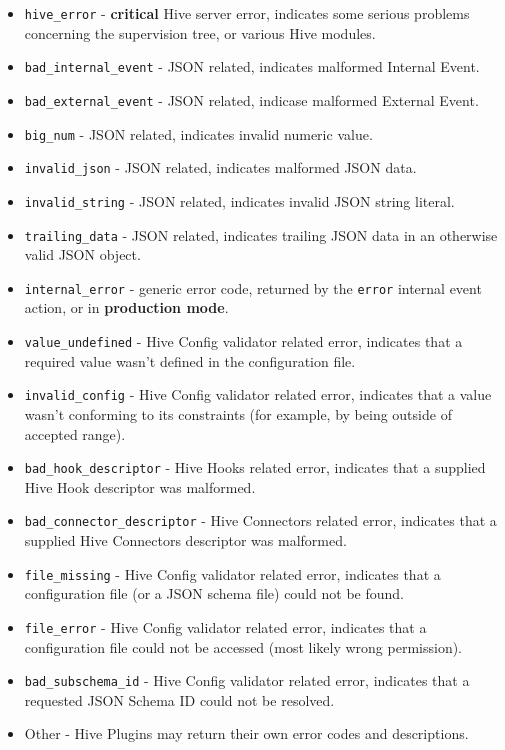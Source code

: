 \documentclass[a4paper]{article}
\begin{document}
\begin{itemize}
\item \texttt{hive\_error} - \textbf{critical} Hive server error, indicates some serious problems concerning the supervision tree, or various Hive modules.
\item \texttt{bad\_internal\_event} - JSON related, indicates malformed Internal Event.
\item \texttt{bad\_external\_event} - JSON related, indicase malformed External Event.
\item \texttt{big\_num} - JSON related, indicates invalid numeric value.
\item \texttt{invalid\_json} - JSON related, indicates malformed JSON data.
\item \texttt{invalid\_string} - JSON related, indicates invalid JSON string literal.
\item \texttt{trailing\_data} - JSON related, indicates trailing JSON data in an otherwise valid JSON object.
\item \texttt{internal\_error} - generic error code, returned by the \texttt{error} internal event action, or in \textbf{production mode}.
\item \texttt{value\_undefined} - Hive Config validator related error, indicates that a required value wasn't defined in the configuration file.
\item \texttt{invalid\_config} - Hive Config validator related error, indicates that a value wasn't conforming to its constraints (for example, by being outside of accepted range).
\item \texttt{bad\_hook\_descriptor} - Hive Hooks related error, indicates that a supplied Hive Hook descriptor was malformed.
\item \texttt{bad\_connector\_descriptor} - Hive Connectors related error, indicates that a supplied Hive Connectors descriptor was malformed.
\item \texttt{file\_missing} - Hive Config validator related error, indicates that a configuration file (or a JSON schema file) could not be found.
\item \texttt{file\_error} - Hive Config validator related error, indicates that a configuration file could not be accessed (most likely wrong permission).
\item \texttt{bad\_subschema\_id} - Hive Config validator related error, indicates that a requested JSON Schema ID could not be resolved.
\item Other - Hive Plugins may return their own error codes and descriptions.
\end{itemize}
\end{document}
